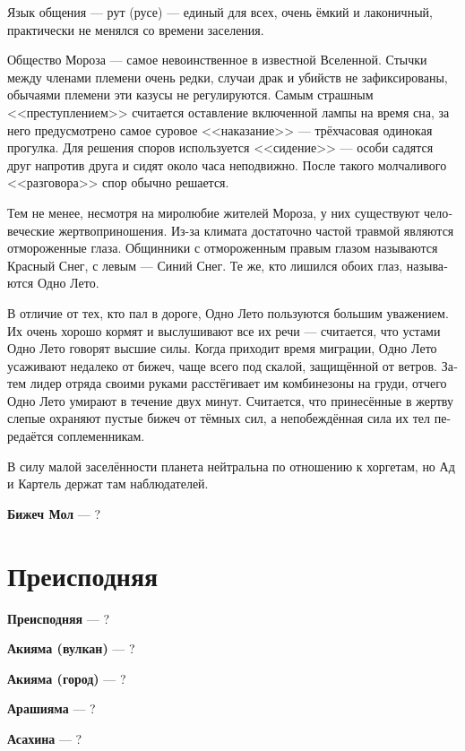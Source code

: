 \documentclass[a4paper,12pt,fleqn]{book}\usepackage{polyglossia}\setdefaultlanguage[babelshorthands=true]{russian}\setotherlanguage{english}\defaultfontfeatures{Ligatures=TeX,Mapping=tex-text}\usepackage{xcolor}\newcommand{\ml}[3]{#2}
\newcommand{\asterism}{\vspace{1em}{\centering\Large\bfseries$\ast~\ast~\ast$\par}\vspace{1em}}
\newcommand{\theterm}[3]{\textbf{\hypertarget{#1}{#2}} --- #3}
\begin{document}
{Язык общения --- рут (русе) --- единый для всех, очень ёмкий и лаконичный, практически не менялся со времени заселения.

Общество Мороза --- самое невоинственное в известной Вселенной.
Стычки между членами племени очень редки, случаи драк и убийств не зафиксированы, обычаями племени эти казусы не регулируются.
Самым страшным <<преступлением>> считается оставление включенной лампы на время сна, за него предусмотрено самое суровое <<наказание>> --- трёхчасовая одинокая прогулка.
Для решения споров используется <<сидение>> --- особи садятся друг напротив друга и сидят около часа неподвижно.
После такого молчаливого <<разговора>> спор обычно решается.

Тем не менее, несмотря на миролюбие жителей Мороза, у них существуют человеческие жертвоприношения.
Из-за климата достаточно частой травмой являются отмороженные глаза.
Общинники с отмороженным правым глазом называются Красный Снег, с левым --- Синий Снег.
Те же, кто лишился обоих глаз, называются Одно Лето.

В отличие от тех, кто пал в дороге, Одно Лето пользуются большим уважением.
Их очень хорошо кормят и выслушивают все их речи --- считается, что устами Одно Лето говорят высшие силы.
Когда приходит время миграции, Одно Лето усаживают недалеко от бижеч, чаще всего под скалой, защищённой от ветров.
Затем лидер отряда своими руками расстёгивает им комбинезоны на груди, отчего Одно Лето умирают в течение двух минут.
Считается, что принесённые в жертву слепые охраняют пустые бижеч от тёмных сил, а непобеждённая сила их тел передаётся соплеменникам.

В силу малой заселённости планета нейтральна по отношению к хоргетам, но Ад и Картель держат там наблюдателей.}

\asterism

\theterm{bizec-mol}
{Бижеч Мол}
{?}

\section{Преисподняя}

\theterm{netherworld}
{Преисподняя}
{?}

\asterism

\theterm{akiyama-volcano}
{Акияма (вулкан)}
{?}

\theterm{akiyama-town}
{Акияма (город)}
{?}

\theterm{arashiyama}
{Арашияма}
{?}

\theterm{asahina}
{Асахина}
{?}
\end{document}
